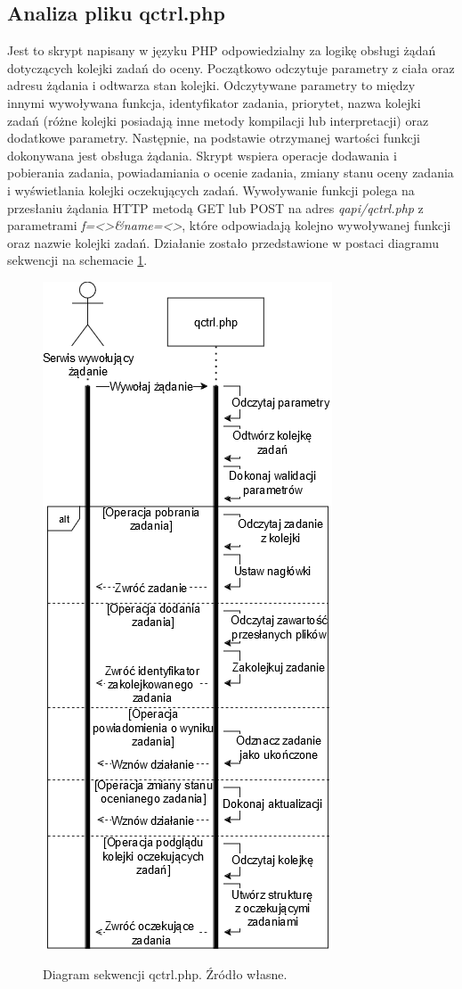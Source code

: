\subsection{Analiza pliku qctrl.php}
Jest to skrypt napisany w języku PHP odpowiedzialny za logikę obsługi żądań dotyczących kolejki zadań do oceny. Początkowo odczytuje parametry z ciała oraz adresu żądania i odtwarza stan kolejki. Odczytywane parametry to między innymi wywoływana funkcja, identyfikator zadania, priorytet, nazwa kolejki zadań (różne kolejki posiadają inne metody kompilacji lub interpretacji) oraz dodatkowe parametry. Następnie, na podstawie otrzymanej wartości funkcji dokonywana jest obsługa żądania. Skrypt wspiera operacje dodawania i pobierania zadania, powiadamiania o ocenie zadania, zmiany stanu oceny zadania i wyświetlania kolejki oczekujących zadań. Wywoływanie funkcji polega na przesłaniu żądania HTTP metodą GET lub POST na adres \textit{qapi/qctrl.php} z parametrami \textit{f=<>\&name=<>}, które odpowiadają kolejno wywoływanej funkcji oraz nazwie kolejki zadań. Działanie zostało przedstawione w postaci diagramu sekwencji na schemacie \ref{qctrl}.
\begin{figure}[!h]
	\begin{center}
		\resizebox{0.6\textwidth}{!} {
			\includegraphics{img/2/qctrl.png}
		}
		\caption[Diagram sekwencji qctrl.php]{Diagram sekwencji qctrl.php. Źródło własne.}
		\label{qctrl}
	\end{center}
\end{figure}


